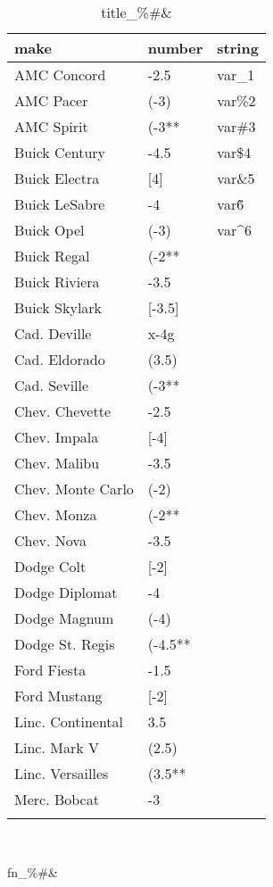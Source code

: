 \documentclass{article}
\begin{document}
\begin{table}[tbp] \centering
{}

\caption{title\_\%\#\&}
\begin{tabularx}{\linewidth}{@{}lCC@{}}

\toprule
{make}&{number}&{string} \tabularnewline
\midrule \addlinespace[\belowrulesep]
AMC Concord&-2.5&var\_1 \tabularnewline
AMC Pacer&(-3)&var\%2 \tabularnewline
AMC Spirit&(-3**&var\#3 \tabularnewline
Buick Century&-4.5&var\$4 \tabularnewline
Buick Electra&[4]&var\&5 \tabularnewline
Buick LeSabre&-4&var\~6 \tabularnewline
Buick Opel&(-3)&var\^{}6 \tabularnewline
Buick Regal&(-2**& \tabularnewline
Buick Riviera&-3.5& \tabularnewline
Buick Skylark&[-3.5]& \tabularnewline
Cad. Deville&x-4g& \tabularnewline
Cad. Eldorado&(3.5)& \tabularnewline
Cad. Seville&(-3**& \tabularnewline
Chev. Chevette&-2.5& \tabularnewline
Chev. Impala&[-4]& \tabularnewline
Chev. Malibu&-3.5& \tabularnewline
Chev. Monte Carlo&(-2)& \tabularnewline
Chev. Monza&(-2**& \tabularnewline
Chev. Nova&-3.5& \tabularnewline
Dodge Colt&[-2]& \tabularnewline
Dodge Diplomat&-4& \tabularnewline
Dodge Magnum&(-4)& \tabularnewline
Dodge St. Regis&(-4.5**& \tabularnewline
Ford Fiesta&-1.5& \tabularnewline
Ford Mustang&[-2]& \tabularnewline
Linc. Continental&3.5& \tabularnewline
Linc. Mark V&(2.5)& \tabularnewline
Linc. Versailles&(3.5**& \tabularnewline
Merc. Bobcat&-3& \tabularnewline
\bottomrule \addlinespace[\belowrulesep]

\end{tabularx}
\\ \parbox{\linewidth}{\footnotesize fn\_\%\#\&}
\end{table}
\end{document}

